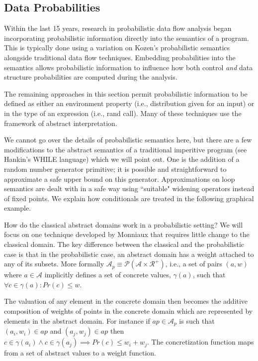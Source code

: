 \subsection{Data Probabilities}

Within the last 15 years, research in probabilistic data flow analysis
began incorporating probabilistic information directly into
the semantics of a program.
This is typically done using a variation on Kozen's 
probabilistic semantics alongside traditional data
flow techniques.
Embedding probabilities into the semantics allows probabilistic
information to influence how both control {\sl and} data structure
probabilities are computed during the analysis.

The remaining approaches in this section permit probabilistic
information to be defined as either an environment property
(i.e., distribution given for an input) or in the type of
an expression (i.e., rand call).
Many of these techniques use the framework of abstract
interpretation.

We cannot go over the details of probabilistic semantics here, but there
are a few modifications to the abstract semantics of a
traditional imperitive program (see Hankin's WHILE language) 
which we will point out.
One is the addition of a random number generator primitive; it
is possible and straightforward to approximate a safe upper
bound on this generator.
Approximations on loop semantics are dealt with in a safe way
using ``suitable" widening operators instead of fixed points.
We explain how conditionals are treated in the following
graphical example.


How do the classical abstract domains work in a
probabilistic setting?
We will focus on one technique developed by Monniaux
that requires little change to the classical domain.
The key difference between the classical and the probabilistic 
case is that in the probabilistic case, 
an abstract domain has a weight attached to any of its subsets.
More formally
$\mathcal{A}_p \equiv \mathcal{P}(\mathcal{A} \times \mathcal{R}^+)$, 
i.e., a set of pairs $(a,w)$ where $a \in \mathcal{A}$ implicitly
defines a set of concrete values, $\gamma(a)$, such that
$\forall c \in \gamma(a) : Pr(c) \le w$.

The valuation of any element in the concrete domain then 
becomes the additive composition of weights of points in 
the concrete domain which are represented by elements in
the abstract domain.
For instance if $ap \in \mathcal{A}_p$ is such that
$(a_i,w_i) \in ap$ and 
$(a_j,w_j) \in ap$ then $c \in \gamma(a_i) \wedge
c \in \gamma(a_j) \implies Pr(c) \le w_i + w_j$.
The concretization function maps from a set of abstract
values to a weight function.


